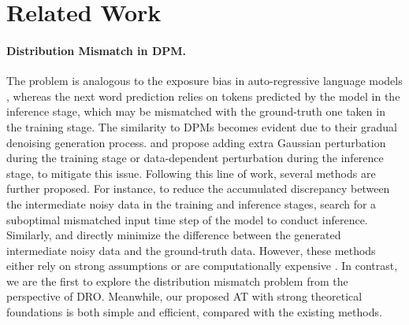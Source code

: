\section{Related Work}
\paragraph{Distribution Mismatch in DPM.}
The problem is analogous to the exposure bias in auto-regressive language models \citep{bengio2015scheduled, ranzato2016sequence, shen2016minimum,steven2017self,zhang2019bridging}, whereas the next word prediction \citep{radford2019language} relies on tokens predicted by the model in the inference stage, which may be mismatched with the ground-truth one taken in the training stage. The similarity to DPMs becomes evident due to their gradual denoising generation process. \citet{diffusion-ip} and \citet{es} propose adding extra Gaussian perturbation during the training stage or data-dependent perturbation during the inference stage, to mitigate this issue. Following this line of work, several methods are further proposed. For instance, to reduce the accumulated discrepancy between the intermediate noisy data in the training and inference stages, \citet{li2024alleviating} search for a suboptimal mismatched input time step of the model to conduct inference. 
Similarly, \citet{li2024on} and \citet{ren2024multistep} directly minimize the difference between the generated intermediate noisy data and the ground-truth data. However, these methods either rely on strong assumptions \citep{diffusion-ip, es, li2024alleviating, ren2024multistep} or are computationally expensive \citep{li2024on}.
In contrast, we are the first to explore the distribution mismatch problem from the perspective of DRO. Meanwhile, our proposed AT with strong theoretical foundations is both simple and efficient, compared with the existing methods. 

